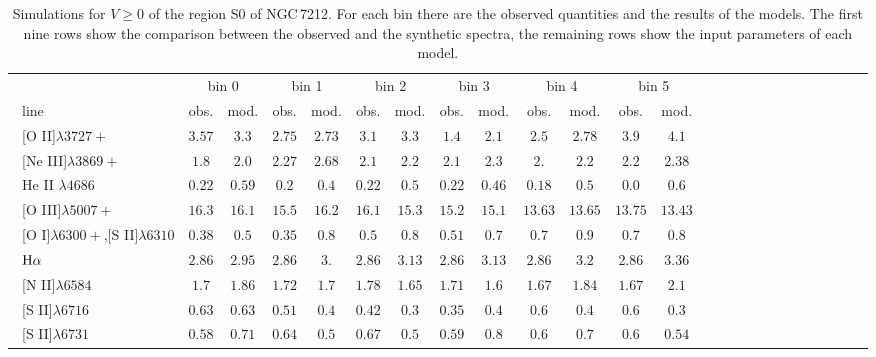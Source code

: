 \documentclass[../thesis.tex]{subfiles}
\begin{document}
\begin{landscape}
\begin{table}

\centering
\caption{Simulations for $V\ge0$ of the region S0 of NGC\,7212. For each bin there are the observed quantities and the results of the models. The first nine rows show the comparison between the observed and the synthetic spectra, the remaining rows show the input parameters of each model.}
\label{tab:sim_so+N}


\small{
\begin{tabular}{lcccccccccccccccccccccccc}
\hline
\ &\multicolumn{2}{c}{bin 0} &\multicolumn{2}{c}{bin 1}&\multicolumn{2}{c}{bin 2}&\multicolumn{2}{c}{bin 3}&\multicolumn{2}{c}{bin 4}&\multicolumn{2}{c}{bin 5}\\
\   line              &obs.  &mod. & obs.  &mod. &obs.&mod.  &obs.  &mod.&obs.  &mod. &obs.  &mod. \\ \hline
\ [O II]$\lambda3727+$          &$3.57  $&$3.3   $&$2.75   $&$ 2.73 $&$3.1  $&$3.3   $&$1.4   $&$2.1  $&$2.5   $&$2.78  $&$3.9   $&$4.1 $  \\
\  [Ne III]$\lambda3869+$        &$1.8   $&$2.0   $&$2.27   $&$ 2.68 $&$2.1  $&$2.2   $&$2.1   $&$2.3   $&$2.    $&$2.2   $&$2.2   $&$2.38$  \\
\  He II $\lambda4686$           &$0.22  $&$0.59  $&$0.2    $&$ 0.4  $&$0.22 $&$0.5   $&$0.22  $&$0.46  $&$0.18  $&$0.5   $&$0.0   $&$0.6  $\\
\  [O III]$\lambda5007+$        &$16.3  $&$16.1  $&$ 15.5  $&$ 16.2 $&$16.1 $&$15.3  $&$15.2  $&$15.1  $&$13.63 $&$13.65 $&$13.75 $&$13.43$\\
\  [O I]$\lambda6300+$,[S II]$\lambda6310$&$0.38  $&$0.5   $&$0.35   $&$0.8   $&$0.5  $&$0.8   $&$0.51  $&$0.7   $&$0.7   $&$0.9   $&$0.7   $&$0.8 $ \\
\ $\rm H\alpha$                 &$2.86  $&$2.95  $&$2.86   $&$ 3.   $&$2.86 $&$3.13  $&$2.86  $&$3.13  $&$2.86  $&$3.2   $&$2.86  $&$3.36 $\\
\  [N II]$\lambda6584$           &$1.7   $&$1.86  $&$1.72   $&$ 1.7  $&$1.78 $&$1.65  $&$1.71  $&$1.6   $&$1.67  $&$1.84  $&$1.67  $&$2.1 $ \\
\  [S II]$\lambda6716$           &$0.63  $&$0.63  $&$0.51   $&$ 0.4  $&$0.42 $&$0.3   $&$0.35  $&$0.4   $&$0.6   $&$0.4   $&$0.6   $&$0.3 $ \\
\  [S II]$\lambda6731$           &$0.58  $&$0.71  $&$0.64   $&$ 0.5  $&$0.67 $&$0.5   $&$0.59  $&$0.8   $&$0.6   $&$0.7   $&$0.6   $&$0.54$ \\

\end{tabular}}
\end{table}
\end{landscape}
\end{document}
